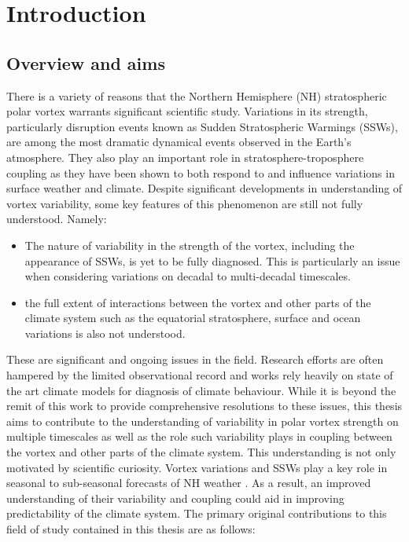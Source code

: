 \chapter{Introduction}
\label{cha:intro}

\section{Overview and aims}
\label{sec:overview}

There is a variety of reasons that the Northern Hemisphere (NH) stratospheric polar vortex warrants significant scientific study. Variations in its strength, particularly disruption events known as Sudden Stratospheric Warmings (SSWs), are among the most dramatic dynamical events observed in the Earth's atmosphere. They also play an important role in stratosphere-troposphere coupling as they have been shown to both respond to and influence variations in surface weather and climate. Despite significant developments in understanding of vortex variability, some key features of this phenomenon are still not fully understood. Namely: 

\begin{itemize}
    \item The nature of variability in the strength of the vortex, including the appearance of SSWs, is yet to be fully diagnosed. This is particularly an issue when considering variations on decadal to multi-decadal timescales.  
    
    \item the full extent of interactions between the vortex and other parts of the climate system such as the equatorial stratosphere, surface and ocean variations is also not understood. 

\end{itemize}

These are significant and ongoing issues in the field. Research efforts are often hampered by the limited observational record and works rely heavily on state of the art climate models for diagnosis of climate behaviour. While it is beyond the remit of this work to provide comprehensive resolutions to these issues, this thesis aims to contribute to the understanding of variability in polar vortex strength on multiple timescales as well as the role such variability plays in coupling between the vortex and other parts of the climate system. This understanding is not only motivated by scientific curiosity. Vortex variations and SSWs play a key role in seasonal to sub-seasonal forecasts of NH weather \citep{Domeison2019-1, Domeison2019-2}. As a result, an improved understanding of their variability and coupling could aid in improving predictability of the climate system. The primary original contributions to this field of study contained in this thesis are as follows:


